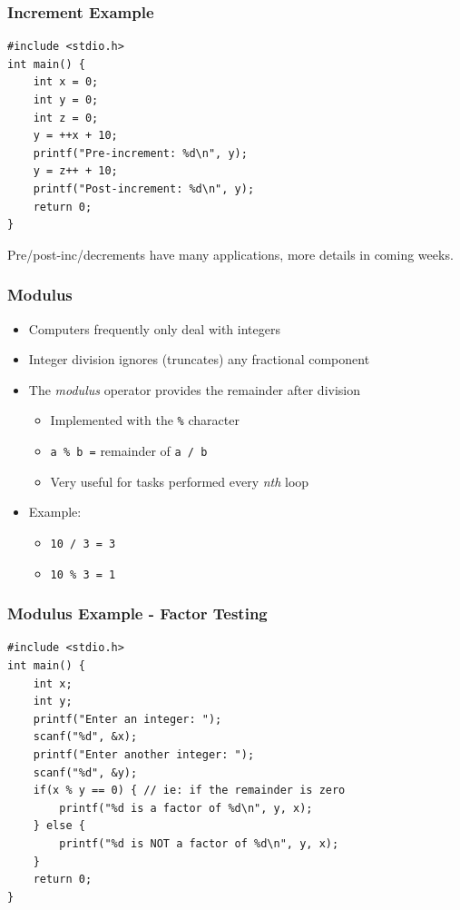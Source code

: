 \documentclass[14pt]{beamer}
\begin{document}
\begin{frame}[fragile]
\frametitle{Increment Example}
\begin{lstlisting}[style=CStyle]
#include <stdio.h>
int main() {
	int x = 0;
	int y = 0;
	int z = 0;
	y = ++x + 10;
	printf("Pre-increment: %d\n", y);
	y = z++ + 10;
	printf("Post-increment: %d\n", y);
	return 0;
}
\end{lstlisting}
Pre/post-inc/decrements have many applications, more details in coming weeks.
\end{frame}

\begin{frame}
\frametitle{Modulus}
\begin{itemize}
\item Computers frequently only deal with integers
\item Integer division ignores (truncates) any fractional component
\item The \textit{modulus} operator provides the remainder after division
\begin{itemize}
	\item Implemented with the \texttt{\%} character
	\item \texttt{a \% b =} remainder of \texttt{a / b}
	\item Very useful for tasks performed every \textit{nth} loop
\end{itemize}
\item Example:
	\begin{itemize}	
		\item \texttt{10 / 3 = 3}
		\item \texttt{10 \% 3 = 1}
	\end{itemize}
\end{itemize}
\end{frame}

\begin{frame}[fragile]
\frametitle{Modulus Example - Factor Testing}
\begin{lstlisting}[style=CStyle]
#include <stdio.h>
int main() {
	int x;
	int y;
	printf("Enter an integer: ");
	scanf("%d", &x);
	printf("Enter another integer: ");
	scanf("%d", &y);
	if(x % y == 0) { // ie: if the remainder is zero
		printf("%d is a factor of %d\n", y, x);
	} else {
		printf("%d is NOT a factor of %d\n", y, x);
	}
	return 0;
}
\end{lstlisting}
\end{frame}
\end{document}

